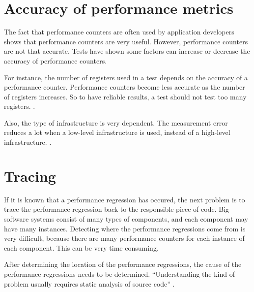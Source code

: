 \section{Accuracy of performance metrics}
The fact that performance counters are often used by application developers shows that performance counters are very useful. However, performance counters are not that accurate. Tests have shown some factors can increase or decrease the accuracy of performance counters.


For instance, the number of registers used in a test depends on the accuracy of a performance counter. Performance counters become less accurate as the number of registers increases. So to have reliable results, a test should not test too many registers. \cite{AccuracyPerformanceCounter}.

Also, the type of infrastructure is very dependent. The measurement error reduces a lot when a low-level infrastructure is used, instead of a high-level infrastructure. \cite{AccuracyPerformanceCounter}.

\section{Tracing}
If it is known that a performance regression has occured, the next problem is to trace the performance regression back to the responsible piece of code. Big software systems consist of many types of components, and each component may have many instances. Detecting where the performance regressions come from is very difficult, because there are many performance counters for each instance of each component. This can be very time consuming.

After determining the location of the performance regressions, the cause of the performance regressions needs to be determined. ``Understanding the kind of problem usually requires static analysis of source code'' \cite{nguyen2012using}.


